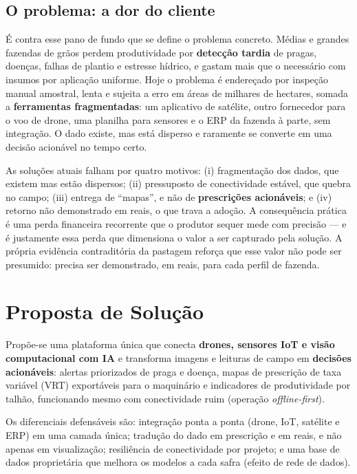 \documentclass[conference]{IEEEtran}
\begin{document}
\subsection{O problema: a dor do cliente}
É contra esse pano de fundo que se define o problema concreto. Médias e grandes fazendas de grãos perdem produtividade por \textbf{detecção tardia} de pragas, doenças, falhas de plantio e estresse hídrico, e gastam mais que o necessário com insumos por aplicação uniforme. Hoje o problema é endereçado por inspeção manual amostral, lenta e sujeita a erro em áreas de milhares de hectares, somada a \textbf{ferramentas fragmentadas}: um aplicativo de satélite, outro fornecedor para o voo de drone, uma planilha para sensores e o ERP da fazenda à parte, sem integração. O dado existe, mas está disperso e raramente se converte em uma decisão acionável no tempo certo.

As soluções atuais falham por quatro motivos: (i) fragmentação dos dados, que existem mas estão dispersos; (ii) pressuposto de conectividade estável, que quebra no campo; (iii) entrega de ``mapas'', e não de \textbf{prescrições acionáveis}; e (iv) retorno não demonstrado em reais, o que trava a adoção. A consequência prática é uma perda financeira recorrente que o produtor sequer mede com precisão --- e é justamente essa perda que dimensiona o valor a ser capturado pela solução. A própria evidência contraditória da pastagem reforça que esse valor não pode ser presumido: precisa ser demonstrado, em reais, para cada perfil de fazenda.

\section{Proposta de Solução}
Propõe-se uma plataforma única que conecta \textbf{drones, sensores IoT e visão computacional com IA} e transforma imagens e leituras de campo em \textbf{decisões acionáveis}: alertas priorizados de praga e doença, mapas de prescrição de taxa variável (VRT) exportáveis para o maquinário e indicadores de produtividade por talhão, funcionando mesmo com conectividade ruim (operação \textit{offline-first}).

Os diferenciais defensáveis são: integração ponta a ponta (drone, IoT, satélite e ERP) em uma camada única; tradução do dado em prescrição e em reais, e não apenas em visualização; resiliência de conectividade por projeto; e uma base de dados proprietária que melhora os modelos a cada safra (efeito de rede de dados).
\end{document}
